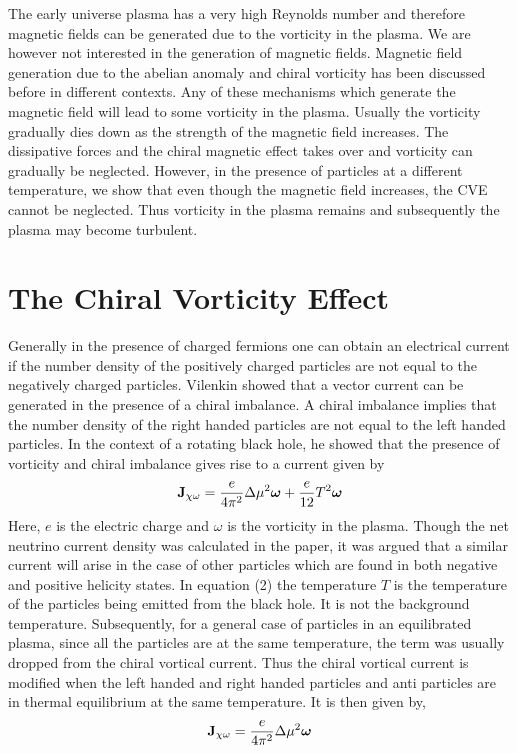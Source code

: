 \documentclass{ws-mpla}
\begin{document}
The early universe plasma has a very high Reynolds number and therefore magnetic fields can be generated due to the vorticity in the plasma. We are however
not interested in the generation of magnetic fields. Magnetic field generation due to the abelian anomaly and chiral vorticity has been discussed 
before in different contexts\cite{joyce,bhatt}. Any of these mechanisms which generate the magnetic field will lead to some vorticity in the plasma. 
Usually the vorticity gradually dies down as the strength of the magnetic field increases. The dissipative forces and the chiral magnetic effect takes over 
and vorticity can gradually be neglected. However, in the presence of particles at a different temperature, we show that even though the magnetic field increases, the CVE
cannot be neglected. Thus vorticity in the plasma remains and subsequently the plasma may become turbulent. 

 


\section{The Chiral Vorticity Effect}
\label{sec:cve}
Generally in the presence of charged fermions one can obtain an electrical current if the number density of the positively charged particles are not equal to
the negatively charged particles. Vilenkin \cite{vilenkin} showed that a vector current can
be generated in the presence of a chiral imbalance. A chiral imbalance implies 
that the number density of the right handed particles are not equal to the 
left handed particles. In the context of a rotating black hole, he showed that the presence of vorticity and chiral imbalance gives rise to a current given by 
\begin{equation}
 \label{cvecurrent1}
 {\bf{J}}_{\chi \omega} = \frac{e}{4 \pi^2} \Delta \mu^2 {\bm{\omega}} +  \frac{e}{12} T^2 {\bm{\omega}}
\end{equation}
Here, $e$ is the electric charge and $\omega$ is the vorticity in the plasma. 
Though the net neutrino current density was calculated in the paper, it was argued that a similar current will arise in the case of other particles which are 
found in both negative and positive helicity states. 
In equation (2) the temperature $T$ is the temperature of the particles being emitted from the black hole. It is not the background temperature. Subsequently, 
for a general case of particles in an equilibrated plasma, since all the particles are at the same temperature, the term was usually dropped from the chiral vortical current.
Thus the chiral vortical current is modified when the left handed and right handed particles and anti particles are 
in thermal equilibrium at the same temperature. It is then given by, 
\begin{equation}
 \label{cvecurrent2}
 {\bf{J}}_{\chi \omega} = \frac{e}{4 \pi^2} \Delta \mu^2 {\bm{\omega}}
\end{equation}
\end{document}
